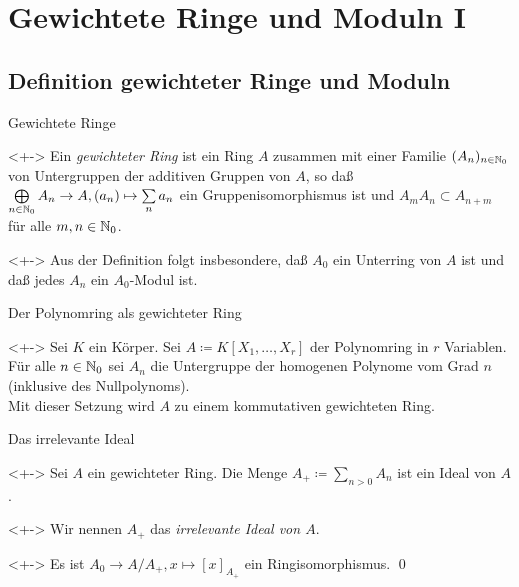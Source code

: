 \section{Gewichtete Ringe und Moduln I}

\subsection{Definition gewichteter Ringe und Moduln}

\begin{frame}{Gewichtete Ringe}
	\begin{definition}<+->
		Ein \emph{gewichteter Ring} ist ein Ring \(A\) zusammen mit einer
		Familie \((A_n)_{n \in \mathbb N_0}\) von Untergruppen der additiven
		Gruppen von \(A\), so daß
		\(\bigoplus\limits_{n \in \mathbb N_0} A_n \to A, (a_n) \mapsto
		\sum\limits_n a_n\) ein Gruppenisomorphismus ist und
		\(A_m A_n \subset A_{n + m}\) für alle \(m, n \in \mathbb N_0\).
	\end{definition}
	\begin{visibleenv}<+->
		Aus der Definition folgt insbesondere, daß \(A_0\) ein Unterring
		von \(A\) ist und daß jedes \(A_n\) ein \(A_0\)-Modul ist.
	\end{visibleenv}
\end{frame}

\begin{frame}{Der Polynomring als gewichteter Ring}
	\begin{example}<+->
		Sei \(K\) ein Körper. Sei \(A \coloneqq K[X_1, \dotsc, X_r]\) der
		Polynomring in \(r\) Variablen. 
		\\
		Für alle \(n \in \mathbb N_0\) sei \(A_n\) die Untergruppe der homogenen
		Polynome vom Grad \(n\) (inklusive des Nullpolynoms).
		\\
		Mit dieser Setzung wird \(A\) zu einem kommutativen gewichteten Ring.
	\end{example}
\end{frame}

\begin{frame}{Das irrelevante Ideal}
	\begin{visibleenv}<+->
		Sei \(A\) ein gewichteter Ring. Die Menge
		\(A_+ \coloneqq \sum\limits_{n > 0} A_n\) ist ein Ideal von \(A\).
	\end{visibleenv}
	\begin{notation}<+->
		Wir nennen \(A_+\) das \emph{irrelevante Ideal von \(A\)}.
	\end{notation}
	\begin{proposition}<+->
		Es ist \(A_0 \to A/A_+, x \mapsto [x]_{A_+}\) ein Ringisomorphismus.
		\qed
	\end{proposition}
\end{frame}

